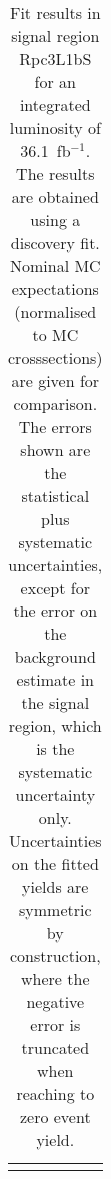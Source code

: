 \begin{table}
\begin{center}
{\begin{tabular*}{\textwidth}{@{\extracolsep{\fill}}lr}
\noalign{\smallskip}\hline\noalign{\smallskip}
\end{tabular*}
}
\end{center}
\caption{Fit results in signal region Rpc3L1bS for an integrated luminosity of 36.1~fb$^{-1}$.
The results are obtained using a discovery fit. Nominal MC expectations (normalised to MC crosssections) are given for comparison.
The errors shown are the statistical plus systematic uncertainties, except for the error on the background estimate in the signal region, which is the systematic uncertainty only.
Uncertainties on the fitted yields are symmetric by construction, where the negative error is truncated when reaching to zero event yield.
}
\label{table.results.systematics.in.logL.fit..Yields.Rpc3L1bS}
\end{table}
\clearpage
%